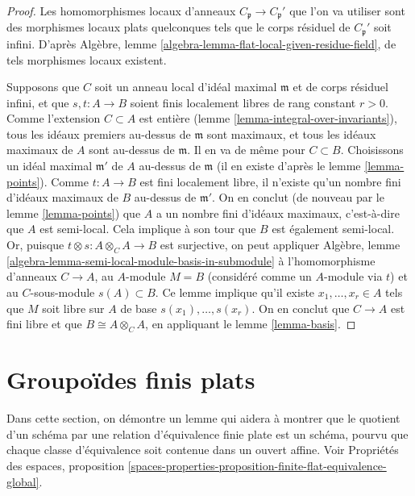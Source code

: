 \begin{proof}
\medskip\noindent
Les homomorphismes locaux d'anneaux $C_{\mathfrak p} \to C_{\mathfrak p}'$ que l'on va
utiliser sont des morphismes locaux plats quelconques tels que le corps résiduel de
$C_{\mathfrak p}'$ soit infini.
D'après Algèbre, lemme \ref{algebra-lemma-flat-local-given-residue-field},
de tels morphismes locaux existent.

\medskip\noindent
Supposons que $C$ soit un anneau local d'idéal maximal $\mathfrak m$ et
de corps résiduel infini, et que $s, t : A \to B$ soient
finis localement libres de rang constant $r > 0$.
Comme l'extension $C \subset A$ est entière (lemme \ref{lemma-integral-over-invariants}),
tous les idéaux premiers au-dessus de $\mathfrak m$ sont maximaux, et tous les idéaux maximaux
de $A$ sont au-dessus de $\mathfrak m$. Il en va de même pour $C \subset B$.
Choisissons un idéal maximal $\mathfrak m'$
de $A$ au-dessus de $\mathfrak m$ (il en existe d'après le lemme \ref{lemma-points}).
Comme $t : A \to B$ est fini localement libre, il n'existe qu'un nombre fini
d'idéaux maximaux de $B$ au-dessus de $\mathfrak m'$. On en conclut
(de nouveau par le lemme \ref{lemma-points})
que $A$ a un nombre fini d'idéaux maximaux, c'est-à-dire que
$A$ est semi-local. Cela implique à son tour que $B$ est également
semi-local. Or, puisque $t \otimes s : A \otimes_C A \to B$ est surjective,
on peut appliquer
Algèbre, lemme \ref{algebra-lemma-semi-local-module-basis-in-submodule}
à l'homomorphisme d'anneaux $C \to A$, au $A$-module $M = B$ (considéré comme un $A$-module
via $t$) et au $C$-sous-module $s(A) \subset B$. Ce lemme implique qu'il
existe $x_1, \ldots, x_r \in A$ tels que $M$ soit libre sur $A$
de base $s(x_1), \ldots, s(x_r)$. On en conclut que $C \to A$ est fini libre
et que $B \cong A \otimes_C A$, en appliquant
le lemme \ref{lemma-basis}.
\end{proof}



\section{Groupoïdes finis plats}
\label{section-finite-flat-general}

\noindent
Dans cette section, on démontre un lemme qui aidera à montrer que le quotient
d'un schéma par une relation d'équivalence finie plate est un schéma, pourvu que
chaque classe d'équivalence soit contenue dans un ouvert affine. Voir
Propriétés des espaces,
proposition \ref{spaces-properties-proposition-finite-flat-equivalence-global}.


